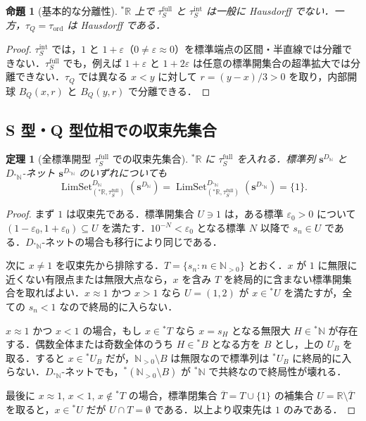 \documentclass[a4paper,11pt]{ltjsarticle}
\theoremstyle{jpdef}
\theoremstyle{jpthm}
\newtheorem{theorem}[definition]{定理}
\newtheorem{proposition}[definition]{命題}
\newcommand{\N}{\mathbb{N}}
\newcommand{\R}{\mathbb{R}}
\newcommand{\LimSet}{\operatorname{LimSet}}
\newcommand{\Ns}{\N_{>0}}
\newcommand{\DN}{D_{\N}}
\newcommand{\DStarN}{D_{{}^{\ast}\N}}
\newcommand{\ulim}[1]{{}^{\ast}#1}
\newcommand{\taufullS}{\tau^{\mathrm{full}}_{S}}
\newcommand{\tauintS}{\tau^{\mathrm{int}}_{S}}
\newcommand{\tauQ}{\tau_{Q}}
\newcommand{\tauord}{\tau_{\mathrm{ord}}}
\newcommand{\eps}{\varepsilon}
\begin{document}
\begin{proposition}[基本的な分離性]
\(\ulim\R\) 上で \(\taufullS\) と \(\tauintS\) は一般に Hausdorff でない．一方，\(\tauQ=\tauord\) は Hausdorff である．
\end{proposition}

\begin{proof}
\(\tauintS\) では，\(1\) と \(1+\eps\)（\(0\ne\eps\approx0\)）を標準端点の区間・半直線では分離できない．\(\taufullS\) でも，例えば \(1+\eps\) と \(1+2\eps\) は任意の標準開集合の超準拡大では分離できない．\(\tauQ\) では異なる \(x<y\) に対して \(r=(y-x)/3>0\) を取り，内部開球 \(B_Q(x,r)\) と \(B_Q(y,r)\) で分離できる．
\end{proof}

\subsection{S 型・Q 型位相での収束先集合}

\begin{theorem}[全標準開型 \(\taufullS\) での収束先集合]
\(\ulim\R\) に \(\taufullS\) を入れる．標準列 \(\mathbf s^{\DN}\) と \(\DStarN\)-ネット \(\mathbf s^{\DStarN}\) のいずれについても
\[
  \LimSet^{\DN}_{(\ulim\R,\taufullS)}(\mathbf s^{\DN})
  =
  \LimSet^{\DStarN}_{(\ulim\R,\taufullS)}(\mathbf s^{\DStarN})
  =\{1\}.
\]
\end{theorem}

\begin{proof}
まず \(1\) は収束先である．標準開集合 \(U\ni1\) は，ある標準 \(\eps_0>0\) について \((1-\eps_0,1+\eps_0)\subseteq U\) を満たす．\(10^{-N}<\eps_0\) となる標準 \(N\) 以降で \(s_n\in U\) である．\(\DStarN\)-ネットの場合も移行により同じである．

次に \(x\ne1\) を収束先から排除する．\(T=\{s_n:n\in\Ns\}\) とおく．\(x\) が \(1\) に無限に近くない有限点または無限大点なら，\(x\) を含み \(T\) を終局的に含まない標準開集合を取ればよい．\(x\approx1\) かつ \(x>1\) なら \(U=(1,2)\) が \(x\in\ulim U\) を満たすが，全ての \(s_n<1\) なので終局的に入らない．

\(x\approx1\) かつ \(x<1\) の場合，もし \(x\in\ulim T\) なら \(x=s_H\) となる無限大 \(H\in\ulim\N\) が存在する．偶数全体または奇数全体のうち \(H\in\ulim B\) となる方を \(B\) とし，上の \(U_B\) を取る．すると \(x\in\ulim U_B\) だが，\(\Ns\setminus B\) は無限なので標準列は \(\ulim U_B\) に終局的に入らない．\(\DStarN\)-ネットでも，\(\ulim(\Ns\setminus B)\) が \(\ulim\N\) で共終なので終局性が壊れる．

最後に \(x\approx1\), \(x<1\), \(x\notin\ulim T\) の場合，標準閉集合 \(\overline T=T\cup\{1\}\) の補集合 \(U=\R\setminus\overline T\) を取ると，\(x\in\ulim U\) だが \(U\cap T=\emptyset\) である．以上より収束先は \(1\) のみである．
\end{proof}
\end{document}
